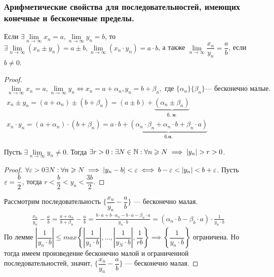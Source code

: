 \documentclass[12pt, a4paper]{article}
\begin{document}
	\subsubsection{Арифметические свойства для последовательностей, имеющих конечные и бесконечные пределы.} 
	Если $\exists \lim\limits_{n \to \infty} x_n = a, \lim\limits_{n \to \infty} y_n = b$, то $\exists \lim\limits_{n \to \infty} (x_n \pm y_n) = a \pm b, \lim\limits_{n \to \infty} (x_n \cdot y_n) = a \cdot b$, а также $\lim\limits_{n \to \infty} \dfrac{x_n}{y_n} = \dfrac{a}{b}$, если $b \neq 0$.
	\begin{proof}
		\[\begin{gathered}
			\lim_{n \to \infty} x_n = a, \lim_{n \to \infty} y_n \iff x_n = a + \alpha_n, y_n = b + \beta_n, \text{ где } \{\alpha_n\} \{\beta_n\} \text{--- бесконечно малые.} \\
			x_n \pm y_n = (a + \alpha_n) \pm (b + \beta_n) = (a \pm b) + \underbrace{(\alpha_n \pm \beta_n)}_{\text{б. м.}} \\
			x_n \cdot y_n = (a + \alpha_n) \cdot (b + \beta_n) = a \cdot b + \underbrace{(\alpha_n \cdot \beta_n + \alpha_n \cdot b + \beta_n \cdot a)}_{\text{б.м.}}
		\end{gathered}\]
		\begin{lemma}
			Пусть $\exists \lim\limits_{n \to \infty} y_n \neq 0$. Тогда $\exists r > 0: \exists N \in \mathbb{N}: \forall n \geqslant N \implies |y_n| > r > 0$.
		\end{lemma}
		\begin{proof}
			$\forall \varepsilon > 0 \exists N: \forall n \geqslant N \implies |y_n - b| < \varepsilon \iff b - \varepsilon < |y_n| < b + \varepsilon$. Пусть $\varepsilon = \dfrac{b}{2}$, тогда $r < \dfrac{b}{2} < y_n < \dfrac{3b}{2}$.
		\end{proof}
		Рассмотрим последовательность $\{\dfrac{x_n}{y_n} - \dfrac{a}{b}\}$ --- бесконечно малая.
		\[\begin{gathered}
			\frac{x_n}{y_n} - \frac{a}{b} = \frac{a + \alpha_n}{b + \beta_n} - \frac{a}{b}
			= \frac{b \cdot a + b \cdot \alpha_n - b \cdot a - \beta_n \cdot a}{y_n \cdot b}
			= (\alpha_n \cdot b - \beta_b \cdot a) \cdot \frac{1}{y_n \cdot b}
		\end{gathered}\]
		По лемме $\left|\dfrac{1}{y_n \cdot b}\right| \leq max\left\{\left|\dfrac{1}{y_1 \cdot b}\right|, \dots, \left|\dfrac{1}{y_N \cdot b}\right|, \dfrac{1}{rb} \right\} \implies \left\{\dfrac{1}{y_n \cdot b}\right\}$ ограничена. Но тогда имеем произведение бесконечно малой и ограниченной последовательностей, значит, $\{\dfrac{x_n}{y_n} - \dfrac{a}{b}\}$ --- бесконечно малая.
	\end{proof}
\end{document}
